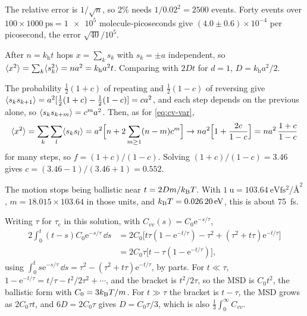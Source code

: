The relative error is $1/\sqrt n$, so 2\% needs
$1/0.02^2 = 2500$ events. Forty events over $100\times\SI{1000}{\pico
\second} = \num{1e5}$ molecule-picoseconds give $(4.0 \pm
0.6)\times10^{-4}$ per picosecond, the error $\sqrt{40}/10^5$.

After $n = k_{\mathrm h}t$ hops $x = \sum_ks_k$
with $s_k = \pm a$ independent, so $\langle x^2 \rangle = \sum_k\langle s_k^2 \rangle = na^2 =
k_{\mathrm h}a^2t$. Comparing with $2Dt$ for $d = 1$, $D = k_{\mathrm
h}a^2/2$.

The probability $\frac12(1 + c)$ of repeating
and $\frac12(1 - c)$ of reversing give $\langle s_ks_{k+1} \rangle = a^2[\frac12(1 +
c) - \frac12(1 - c)] = ca^2$, and each step depends on the previous alone,
so $\langle s_ks_{k+m} \rangle = c^ma^2$. Then, as for \cref{eq:cv-var},
\begin{equation*}
   \langle x^2 \rangle = \sum_k\sum_l\langle s_ks_l \rangle = a^2\Bigl[n + 2\sum_{m\ge1}(n -
   m)c^m\Bigr] \to na^2\Bigl[1 + \frac{2c}{1 - c}\Bigr] = na^2\,\frac{1 +
   c}{1 - c}
\end{equation*}
for many steps, so $f = (1 + c)/(1 - c)$. Solving $(1 + c)/(1 - c) =
3.46$ gives $c = (3.46 - 1)/(3.46 + 1) = 0.552$.

The motion stops being ballistic near $t =
2Dm/k_{\mathrm{B}} T$. With $\SI{1}{\amu} = \SI{103.64}{\electronvolt\femto\second
\squared\per\angstrom\squared}$, $m = 18.015\times103.64$ in those units,
and $k_{\mathrm{B}} T = \SI{0.02620}{\electronvolt}$, this is about
\SI{75}{\femto\second}.

Writing $\tau$ for $\tau_{\mathrm c}$ in this
solution, with $C_{vv}(s) = C_0\mathrm{e}^{-s/\tau}$,
\begin{align*}
   2\int_0^t(t - s)C_0\mathrm{e}^{-s/\tau}\,\dd s
   &= 2C_0\bigl[t\tau(1 - \mathrm{e}^{-t/\tau}) - \tau^2 + (\tau^2 +
   t\tau)\mathrm{e}^{-t/\tau}\bigr]\\
   &= 2C_0\tau\bigl[t - \tau(1 - \mathrm{e}^{-t/\tau})\bigr] ,
\end{align*}
using $\int_0^ts\mathrm{e}^{-s/\tau}\,\dd s = \tau^2 - (\tau^2 +
t\tau)\mathrm{e}^{-t/\tau}$, by parts. For $t \ll \tau$, $1 -
\mathrm{e}^{-t/\tau} = t/\tau - t^2/2\tau^2 + \cdots$, and the bracket is
$t^2/2\tau$, so the MSD is $C_0t^2$, the ballistic form with $C_0 =
3k_{\mathrm{B}} T/m$. For $t \gg \tau$ the bracket is $t - \tau$, the MSD grows as
$2C_0\tau t$, and $6D = 2C_0\tau$ gives $D = C_0\tau/3$, which is also
$\frac13\int_0^\infty C_{vv}$.

